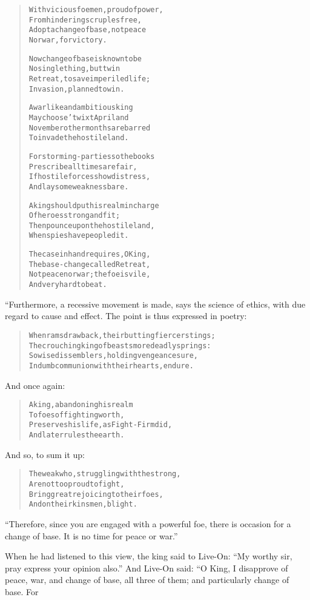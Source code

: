 \documentclass[article, twoside, 14pt]{memoir}
\renewenvironment{verbatim}{%
\begin{quote}%
\vskip -10pt%
\begin{alltt}\normalfont\large}{\end{alltt}%
\end{quote}%
\vskip -10pt
} %
\begin{document}
\begin{verbatim}
With vicious foemen, proud of power,
    From hindering scruples free,
Adopt a change of base, not peace
    Nor war, for victory.

Now change of base is known to be
    No single thing, but twin{\textemdash}
Retreat, to save imperiled life;
    Invasion, planned to win.

A warlike and ambitious king
    May choose 'twixt April and
November{\textemdash}other months are barred{\textemdash}
    To invade the hostile land.

For storming-parties{\textemdash}so the books
    Prescribe{\textemdash}all times are fair,
If hostile forces show distress,
    And lay some weakness bare.

A king should put his realm in charge
    Of heroes strong and fit;
Then pounce upon the hostile land,
    When spies have peopled it.

The case in hand requires, O King,
    The base-change called Retreat,
Not peace nor war; the foe is vile,
    And very hard to beat.
\end{verbatim}
“Furthermore, a recessive movement is made, says the science of
ethics, with due regard to cause and effect. The point is thus
expressed in poetry:

\begin{verbatim}
When rams draw back, their butting fiercer stings;
The crouching king of beasts more deadly springs:
So wise dissemblers, holding vengeance sure,
In dumb communion with their hearts, endure.
\end{verbatim}
And once again:

\begin{verbatim}
A king, abandoning his realm
    To foes of fighting worth,
Preserves his life, as Fight-Firm did,
    And later rules the earth.
\end{verbatim}
And so, to sum it up:

\begin{verbatim}
The weak who, struggling with the strong,
    Are not too proud to fight,
Bring great rejoicing to their foes,
    And on their kinsmen, blight.
\end{verbatim}
``Therefore, since you are engaged with a powerful foe, there is occasion for a change of base. It is no time for peace or war.''

When he had listened to this view, the king said to Live-On:
``My worthy sir, pray express your opinion also.'' And Live-On
said: “O King, I disapprove of peace, war, and change of base, all
three of them; and particularly change of base. For
\end{document}
